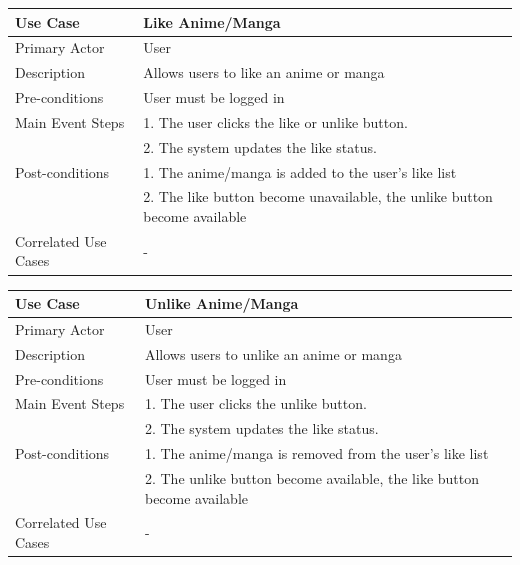\begin{longtable}{|p{}|p{}|}
    \hline
    \rowcolor{lightblue}
    \textbf{Use Case} & \textbf{Like Anime/Manga} \\
    \hline
    Primary Actor & User\\
    \hline
    Description &Allows users to like an anime or manga\\
    \hline
    Pre-conditions &User must be logged in \\
    \hline
    Main Event Steps & 1. The user clicks the like or unlike button. \\
    & 2. The system updates the like status. \\
    \hline
    Post-conditions &1. The anime/manga is added to the user's like list\\
    &2. The like button become unavailable, the unlike button become available \\
    \hline
    Correlated Use Cases &- \\
    \hline
\end{longtable}

\begin{longtable}{|p{}|p{}|}
    \hline
    \rowcolor{lightblue}
    \textbf{Use Case} & \textbf{Unlike Anime/Manga} \\
    \hline
    Primary Actor & User\\
    \hline
    Description &Allows users to unlike an anime or manga\\
    \hline
    Pre-conditions &User must be logged in \\
    \hline
    Main Event Steps & 1. The user clicks the unlike button. \\
    & 2. The system updates the like status. \\
    \hline
    Post-conditions &1. The anime/manga is removed from the user's like list\\
    &2. The unlike button become available, the like button become available \\
    \hline
    Correlated Use Cases &- \\
    \hline
\end{longtable}

\newpage

